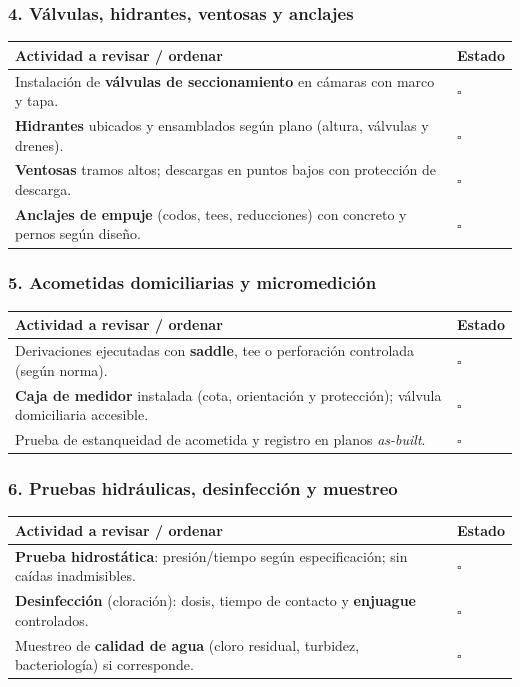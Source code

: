 \documentclass[12pt]{article}
\newcommand{\cbox}{\(\square\)} %
\begin{document}
	\subsubsection*{4. Válvulas, hidrantes, ventosas y anclajes}
	\begin{tabularx}{\linewidth}{>{\raggedright\arraybackslash}p{0.93\linewidth} >{\centering\arraybackslash}m{0.07\linewidth}}
		\toprule
		\textbf{Actividad a revisar / ordenar} & \textbf{Estado}\\
		\midrule
		Instalación de \textbf{válvulas de seccionamiento} en cámaras con marco y tapa. & \cbox \\
		\textbf{Hidrantes} ubicados y ensamblados según plano (altura, válvulas y drenes). & \cbox \\
		\textbf{Ventosas} tramos altos; descargas en puntos bajos con protección de descarga. & \cbox \\
		\textbf{Anclajes de empuje} (codos, tees, reducciones) con concreto y pernos según diseño. & \cbox \\
		\bottomrule
	\end{tabularx}
	
	\subsubsection*{5. Acometidas domiciliarias y micromedición}
	\begin{tabularx}{\linewidth}{>{\raggedright\arraybackslash}p{0.93\linewidth} >{\centering\arraybackslash}m{0.07\linewidth}}
		\toprule
		\textbf{Actividad a revisar / ordenar} & \textbf{Estado}\\
		\midrule
		Derivaciones ejecutadas con \textbf{saddle}, tee o perforación controlada (según norma). & \cbox \\
		\textbf{Caja de medidor} instalada (cota, orientación y protección); válvula domiciliaria accesible. & \cbox \\
		Prueba de estanqueidad de acometida y registro en planos \textit{as-built}. & \cbox \\
		\bottomrule
	\end{tabularx}
	
	\subsubsection*{6. Pruebas hidráulicas, desinfección y muestreo}
	\begin{tabularx}{\linewidth}{>{\raggedright\arraybackslash}p{0.93\linewidth} >{\centering\arraybackslash}m{0.07\linewidth}}
		\toprule
		\textbf{Actividad a revisar / ordenar} & \textbf{Estado}\\
		\midrule
		\textbf{Prueba hidrostática}: presión/tiempo según especificación; sin caídas inadmisibles. & \cbox \\
		\textbf{Desinfección} (cloración): dosis, tiempo de contacto y \textbf{enjuague} controlados. & \cbox \\
		Muestreo de \textbf{calidad de agua} (cloro residual, turbidez, bacteriología) si corresponde. & \cbox \\
		\bottomrule
	\end{tabularx}
	
\end{document}
